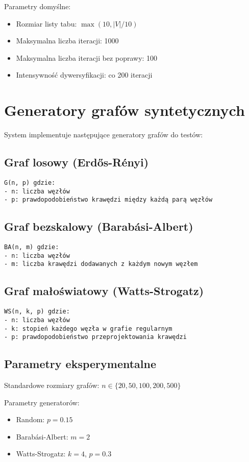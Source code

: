 Parametry domyślne:
\begin{itemize}
\item Rozmiar listy tabu: $\max(10, |V|/10)$
\item Maksymalna liczba iteracji: 1000
\item Maksymalna liczba iteracji bez poprawy: 100
\item Intensywność dywersyfikacji: co 200 iteracji
\end{itemize}

\section{Generatory grafów syntetycznych}

System implementuje następujące generatory grafów do testów:

\subsection{Graf losowy (Erdős-Rényi)}
\begin{verbatim}
G(n, p) gdzie:
- n: liczba węzłów
- p: prawdopodobieństwo krawędzi między każdą parą węzłów
\end{verbatim}

\subsection{Graf bezskalowy (Barabási-Albert)}
\begin{verbatim}
BA(n, m) gdzie:
- n: liczba węzłów
- m: liczba krawędzi dodawanych z każdym nowym węzłem
\end{verbatim}

\subsection{Graf małoświatowy (Watts-Strogatz)}
\begin{verbatim}
WS(n, k, p) gdzie:
- n: liczba węzłów
- k: stopień każdego węzła w grafie regularnym
- p: prawdopodobieństwo przeprojektowania krawędzi
\end{verbatim}

\subsection{Parametry eksperymentalne}

Standardowe rozmiary grafów: $n \in \{20, 50, 100, 200, 500\}$

Parametry generatorów:
\begin{itemize}
\item Random: $p = 0.15$
\item Barabási-Albert: $m = 2$
\item Watts-Strogatz: $k = 4$, $p = 0.3$
\end{itemize}

